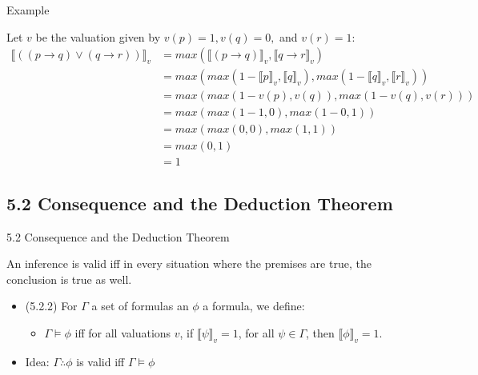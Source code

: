 \documentclass[../slides.tex]{subfiles}
\begin{document}
\begin{frame}{Example}

Let $v$ be the valuation given by $v(p)=1,v(q)=0,$ and $v(r)=1$:
{\small	
		\begin{align*}
		\llbracket ((p\to q)\lor (q\to r))\rrbracket_v &=max(\llbracket (p\to q)\rrbracket_v, \llbracket q\to r\rrbracket_v)\\
		&=max(max(1-\llbracket p\rrbracket_v, \llbracket q\rrbracket_v), max(1-\llbracket q\rrbracket_v, \llbracket r\rrbracket_v))\\
		&=max(max(1-v(p), v(q)), max(1-v(q), v(r)))\\
		&=max(max(1-1, 0), max(1-0, 1))\\
		&=max(max(0, 0), max(1,1))\\
		&=max(0,1)\\
		&=1
		\end{align*}}

\end{frame}

\subsection{5.2 Consequence and the Deduction Theorem}	
\begin{frame}{5.2 Consequence and the Deduction Theorem}	

	\begin{center}
	An inference is valid iff in every situation where the premises are true, the conclusion is true as well.
	\end{center}

	\begin{itemize}
	
		\item (5.2.2) For $\Gamma$ a set of formulas an $\phi$ a formula, we define:
		
		\begin{itemize}
		
			\item $\Gamma\vDash\phi$ iff for all valuations $v$, if $\llbracket\psi\rrbracket_v=1$, for all $\psi\in\Gamma$, then $\llbracket\phi\rrbracket_v=1$.
		
		\end{itemize}
		
		\item Idea: $\Gamma\therefore\phi$ is valid iff $\Gamma\vDash\phi$
	
	\end{itemize}

\end{frame}
\end{document}
